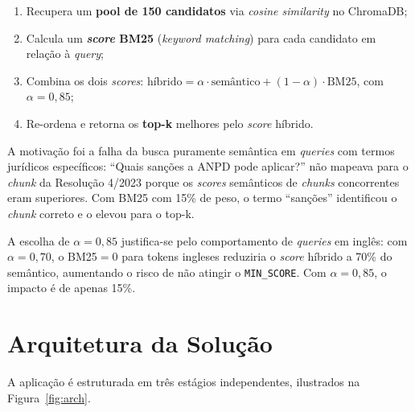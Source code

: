 \documentclass[
  12pt,
  a4paper,
  brazil,
  article,
  oneside,
  sumario=tradicional
]{abntex2}
\begin{document}
\begin{enumerate}[leftmargin=*]
  \item Recupera um \textbf{pool de 150 candidatos} via \textit{cosine similarity}
        no ChromaDB;
  \item Calcula um \textbf{\textit{score} BM25} (\textit{keyword matching}) para
        cada candidato em relação à \textit{query};
  \item Combina os dois \textit{scores}: $\text{híbrido} = \alpha \cdot
        \text{semântico} + (1-\alpha) \cdot \text{BM25}$, com $\alpha = 0{,}85$;
  \item Re-ordena e retorna os \textbf{top-k} melhores pelo \textit{score} híbrido.
\end{enumerate}

A motivação foi a falha da busca puramente semântica em \textit{queries} com termos
jurídicos específicos: ``Quais sanções a ANPD pode aplicar?'' não mapeava para o
\textit{chunk} da Resolução 4/2023 porque os \textit{scores} semânticos de
\textit{chunks} concorrentes eram superiores. Com BM25 com 15\% de peso, o termo
``sanções'' identificou o \textit{chunk} correto e o elevou para o top-k.

A escolha de $\alpha=0{,}85$ justifica-se pelo comportamento de \textit{queries} em
inglês: com $\alpha=0{,}70$, o BM25$=0$ para tokens ingleses reduziria o \textit{score}
híbrido a 70\% do semântico, aumentando o risco de não atingir o
\texttt{MIN\_SCORE}. Com $\alpha=0{,}85$, o impacto é de apenas 15\%.

\section{Arquitetura da Solução}

A aplicação é estruturada em três estágios independentes, ilustrados na
Figura~\ref{fig:arch}.
\end{document}
